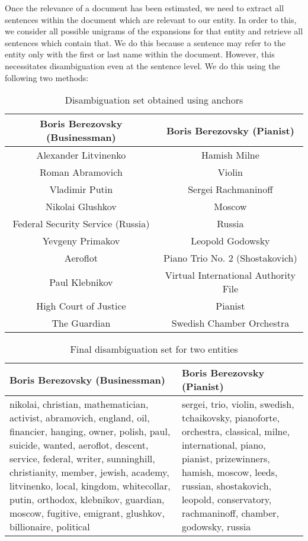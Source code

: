 Once the relevance of a document has been estimated, we need to extract all sentences within the document which are relevant to our entity. In order to this, we consider all possible unigrams of the expansions for that entity and retrieve all sentences which contain that. We do this because a sentence may refer to the entity only with the first or last name within the document. However, this necessitates disambiguation even at the sentence level. We do this using the following two methods:

\begin{table}[ht]
\centering
\begin{tabular}{|c|c|}
\hline
Boris Berezovsky (Businessman) & Boris Berezovsky (Pianist) \\
\hline
Alexander Litvinenko & Hamish Milne \\
Roman Abramovich & Violin \\
Vladimir Putin & Sergei Rachmaninoff \\
Nikolai Glushkov & Moscow \\
Federal Security Service (Russia) & Russia \\
Yevgeny Primakov & Leopold Godowsky \\
Aeroflot & Piano Trio No. 2 (Shostakovich) \\
Paul Klebnikov & Virtual International Authority File \\
High Court of Justice & Pianist \\
The Guardian & Swedish Chamber Orchestra \\
\hline
\end{tabular}
\caption{Disambiguation set obtained using anchors}
\label{tab:disamb_anchors}
\end{table}


\begin{table}[ht]
\centering
\begin{tabular}{|p{7cm}|p{7cm}|}
\hline
Boris Berezovsky (Businessman) & Boris Berezovsky (Pianist) \\
\hline
nikolai, christian, mathematician, activist, abramovich, england, oil, financier, hanging, owner, polish, paul, suicide, wanted, aeroflot, descent, service, federal, writer, sunninghill, christianity, member, jewish, academy, litvinenko, local, kingdom, whitecollar, putin, orthodox, klebnikov, guardian, moscow, fugitive, emigrant, glushkov, billionaire, political & sergei, trio, violin, swedish, tchaikovsky, pianoforte, orchestra, classical, milne, international, piano, pianist, prizewinners, hamish, moscow, leeds, russian, shostakovich, leopold, conservatory, rachmaninoff, chamber, godowsky, russia \\
\hline
\end{tabular}
\caption{Final disambiguation set for two entities}
\label{tab:disamb_final}
\end{table}

